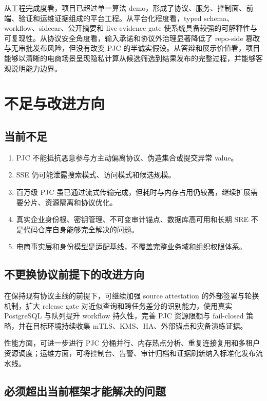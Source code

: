 \documentclass[UTF8,a4paper,12pt,oneside]{ctexrep}
\begin{document}
从工程完成度看，项目已超过单一算法 demo，形成了协议、服务、控制面、前端、验证和运维证据组成的平台工程。从平台化程度看，typed schema、workflow、sidecar、公开摘要和 live evidence gate 使系统具备较强的可解释性与可复现性。从协议安全角度看，输入承诺和协议外治理显著降低了 repo-side 篡改与无审批发布风险，但没有改变 PJC 的半诚实假设。从答辩和展示价值看，项目能够以清晰的电商场景呈现隐私计算从候选筛选到结果发布的完整过程，并能够客观说明能力边界。

\chapter{不足与改进方向}

\section{当前不足}

\begin{enumerate}
  \item PJC 不能抵抗恶意参与方主动偏离协议、伪造集合或提交异常 value。
  \item SSE 仍可能泄露搜索模式、访问模式和候选规模。
  \item 百万级 PJC 虽已通过流式传输完成，但耗时与内存占用仍较高，继续扩展需要分片、资源隔离和协议优化。
  \item 真实企业身份根、密钥管理、不可变审计锚点、数据库高可用和长期 SRE 不是代码仓库自身能够完全解决的问题。
  \item 电商事实层和身份模型是适配基线，不覆盖完整业务域和组织权限体系。
\end{enumerate}

\section{不更换协议前提下的改进方向}

在保持现有协议主线的前提下，可继续加强 source attestation 的外部签署与轮换机制，扩大 release gate 对近似查询和跨任务差分的识别能力，使用真实 PostgreSQL 与队列提升 workflow 持久性，完善 PJC 资源限额与 fail-closed 策略，并在目标环境持续收集 mTLS、KMS、HA、外部锚点和灾备演练证据。

性能方面，可进一步进行 PJC 分桶并行、内存热点分析、重复连接复用和多租户资源调度；运维方面，可将控制台、告警、审计归档和证据刷新纳入标准化发布流水线。

\section{必须超出当前框架才能解决的问题}
\end{document}
